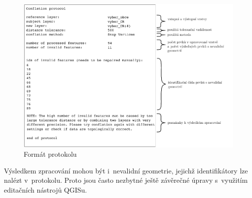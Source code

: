 \label{protokol}
  \begin{figure}[H]
    \centering
      \includegraphics{./pictures/protokol.pdf}
      \caption{Formát protokolu}
      \label{fig:protokol}
  \end{figure} 

Výsledkem zpracování mohou být i~nevalidní geometrie, jejichž identifikátory lze
nalézt v~protokolu. Proto jsou často nezbytné ještě závěrečné úpravy s~využitím
editačních nástrojů QGISu.